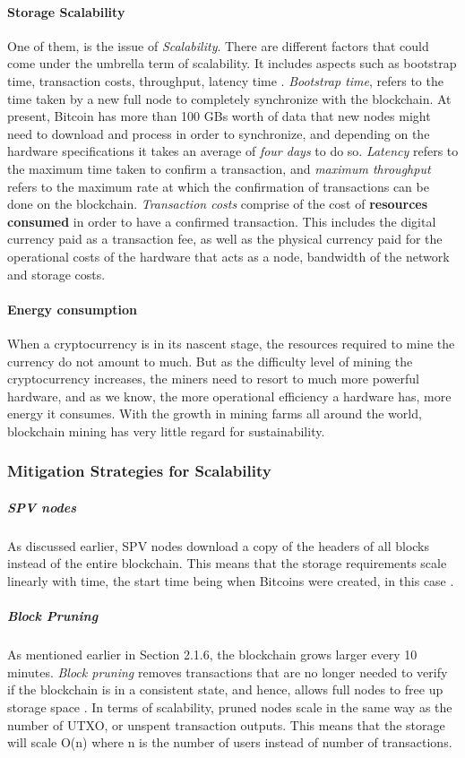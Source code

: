 \documentclass[english]{tktltiki}
\begin{document}
\begin{enumerate}
\paragraph{Storage Scalability}
One of them, is the issue of \textit{Scalability}. There are different factors that could come under the umbrella term of scalability. It includes aspects such as bootstrap time, transaction costs, throughput, latency time \cite{scalability}. \textit{Bootstrap time}, refers to the time taken by a new full node to completely synchronize with the blockchain. At present, Bitcoin has more than 100 GBs worth of data that new nodes might need to download and process in order to synchronize, and depending on the hardware specifications it takes an average of \textit{four days} to do so. \textit{Latency} refers to the maximum time taken to confirm a transaction, and \textit{maximum throughput} refers to the maximum rate at which the confirmation of transactions can be done on the blockchain. \textit{Transaction costs} comprise of the cost of \textbf{resources consumed} in order to have a confirmed transaction. This includes the digital currency paid as a transaction fee, as well as the physical currency paid for the operational costs of the hardware that acts as a node, bandwidth of the network and storage costs.

\paragraph{Energy consumption} 
When a cryptocurrency is in its nascent stage, the resources required to mine the currency do not amount to much. But as the difficulty level of mining the cryptocurrency increases, the miners need to resort to much more powerful hardware, and as we know, the more operational efficiency a hardware has, more energy it consumes. With the growth in mining farms all around the world, blockchain mining has very little regard for sustainability.

\subsubsection*{Mitigation Strategies for Scalability}
\subparagraph{SPV nodes}
As discussed earlier, SPV nodes download a copy of the headers of all blocks instead of the entire blockchain. This means that the storage requirements scale linearly with time, the start time being when Bitcoins were created, in this case \cite{bitcoin}. 

\subparagraph{Block Pruning}
As mentioned earlier in Section 2.1.6, the blockchain grows larger every 10 minutes. \textit{Block pruning} removes transactions that are no longer needed to verify if the blockchain is in a consistent state, and hence, allows full nodes to free up storage space \cite{bitcoin}. In terms of scalability, pruned nodes scale in the same way as the number of UTXO, or unspent transaction outputs. This means that the storage will scale O(n) where n is the number of users instead of number of transactions. 


\end{enumerate}
\end{document}
